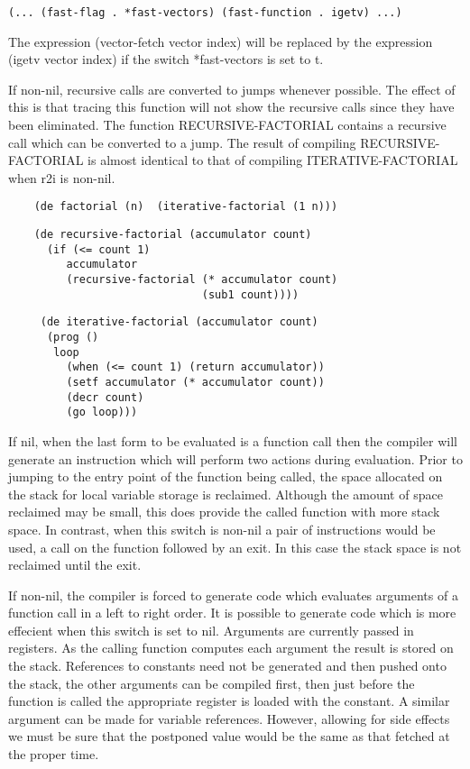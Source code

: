 \begin{verbatim}
(... (fast-flag . *fast-vectors) (fast-function . igetv) ...)
\end{verbatim}
    The expression (vector-fetch vector index) will be replaced by the
    expression (igetv vector index) if the switch *fast-vectors is set
    to t.

{
    If  non-nil, recursive calls are converted to jumps whenever
    possible. The effect of this is that tracing  this  function
    will  not  show  the  recursive  calls  since they have been
    eliminated.  The  function  RECURSIVE-FACTORIAL  contains  a
    recursive  call which can be converted to a jump. The result
    of compiling RECURSIVE-FACTORIAL is almost identical to that
    of compiling ITERATIVE-FACTORIAL when r2i is non-nil.
}
\begin{verbatim}
    (de factorial (n)  (iterative-factorial (1 n)))
\end{verbatim}
\begin{verbatim}
    (de recursive-factorial (accumulator count)
      (if (<= count 1)
         accumulator
         (recursive-factorial (* accumulator count)
                              (sub1 count))))
\end{verbatim}
\begin{verbatim}
     (de iterative-factorial (accumulator count)
      (prog ()
       loop
         (when (<= count 1) (return accumulator))
         (setf accumulator (* accumulator count))
         (decr count)
         (go loop)))
\end{verbatim}
{
    If nil, when the last form to be  evaluated  is  a  function
    call  then  the  compiler will generate an instruction which
    will perform  two  actions  during  evaluation.    Prior  to
    jumping to the entry point of the function being called, the
    space  allocated  on the stack for local variable storage is
    reclaimed. Although the amount of  space  reclaimed  may  be
    small, this does provide the called function with more stack
    space.  In  contrast,  when this switch is non-nil a pair of
    instructions would be used, a call on the function  followed
    by  an  exit.  In this case the stack space is not reclaimed
    until the exit.
}

{
    If non-nil, the compiler is forced to  generate  code  which
    evaluates  arguments  of  a function call in a left to right
    order. It  is  possible  to  generate  code  which  is  more
    effecient  when  this  switch  is  set to nil. Arguments are
    currently passed  in  registers.  As  the  calling  function
    computes  each  argument  the result is stored on the stack.
    References to constants  need  not  be  generated  and  then
    pushed  onto  the stack, the other arguments can be compiled
    first,  then  just  before  the  function  is   called   the
    appropriate  register is loaded with the constant. A similar
    argument can  be  made  for  variable  references.  However,
    allowing for side effects we must be sure that the postponed
    value would be the same as that fetched at the proper time.
}

